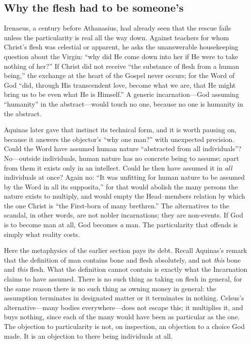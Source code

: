 \subsection{Why the flesh had to be someone's}

Irenaeus, a century before Athanasius, had already seen that the rescue fails unless the particularity is real all the way down. Against teachers for whom Christ's flesh was celestial or apparent, he asks the unanswerable housekeeping question about the Virgin: ``why did He come down into her if He were to take nothing of her?'' If Christ did not receive ``the substance of flesh from a human being,'' the exchange at the heart of the Gospel never occurs; for the Word of God ``did, through His transcendent love, become what we are, that He might bring us to be even what He is Himself.'' A generic incarnation---God assuming ``humanity'' in the abstract---would touch no one, because no one is humanity in the abstract.

Aquinas later gave that instinct its technical form, and it is worth pausing on, because it answers the objector's ``why one man?'' with unexpected precision. Could the Word have assumed human nature ``abstracted from all individuals''? No---outside individuals, human nature has no concrete being to assume; apart from them it exists only in an intellect. Could he then have assumed it in \emph{all} individuals at once? Again no: ``It was unfitting for human nature to be assumed by the Word in all its supposita,'' for that would abolish the many persons the nature exists to multiply, and would empty the Head--members relation by which the one Christ is ``the First-born of many brethren.'' The alternatives to the scandal, in other words, are not nobler incarnations; they are non-events. If God is to become man at all, God becomes \emph{a} man. The particularity that offends is simply what reality costs.

Here the metaphysics of the earlier section pays its debt. Recall Aquinas's remark that the definition of man contains bone and flesh absolutely, and not \emph{this} bone and \emph{this} flesh. What the definition cannot contain is exactly what the Incarnation claims to have assumed. There is no such thing as taking on flesh in general, for the same reason there is no such thing as owning money in general: the assumption terminates in designated matter or it terminates in nothing. Celsus's alternative---many bodies everywhere---does not escape this; it multiplies it, and buys nothing, since each of the many would have been as particular as the one. The objection to particularity is not, on inspection, an objection to a choice God made. It is an objection to there being individuals at all.

